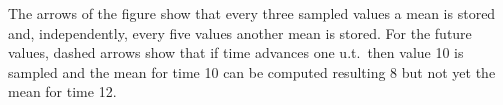 The arrows of the figure show that every three sampled values a mean
is stored and, independently, every five values another mean is
stored. For the future values, dashed arrows show that if time
advances one u.t.\ then value 10 is sampled and the mean for time 10
can be computed resulting 8 but not yet the mean for time 12.





